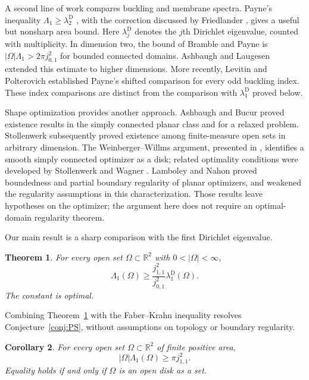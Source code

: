 \documentclass[11pt]{article}
\newtheorem{theorem}{Theorem}[section]
\newtheorem{corollary}[theorem]{Corollary}
\theoremstyle{remark}
\begin{document}
A second line of work compares buckling and membrane spectra. Payne's
inequality $\Lambda_1\ge\lambda_2^{\mathrm D}$ \cite{Payne}, with the
correction discussed by Friedlander \cite{Friedlander}, gives a useful
but nonsharp area bound. Here $\lambda_j^{\mathrm D}$ denotes the
$j$th Dirichlet eigenvalue, counted with multiplicity. In dimension two, the bound of Bramble and
Payne \cite{BramblePayne} is $|\Omega|\Lambda_1>2\pi j_{0,1}^2$ for
bounded connected domains. Ashbaugh and Laugesen \cite{AL} extended this
estimate to higher dimensions. More recently, Levitin and Polterovich
\cite{LP} established Payne's shifted comparison for every odd buckling
index. These index comparisons are distinct from the comparison with
$\lambda_1^{\mathrm D}$ proved below.

Shape optimization provides another approach. Ashbaugh and Bucur
\cite{AB} proved existence results in the simply connected planar class
and for a relaxed problem. Stollenwerk \cite{Stollenwerk} subsequently
proved existence among finite-measure open sets in arbitrary dimension.
The Weinberger--Willms argument, presented in \cite{AB}, identifies a
smooth simply connected optimizer as a disk; related optimality
conditions were developed by Stollenwerk and Wagner \cite{SW}.
Lamboley and Nahon \cite{LN} proved boundedness and partial boundary
regularity of planar optimizers, and weakened the regularity assumptions
in this characterization. Those results leave hypotheses on the
optimizer; the argument here does not require an optimal-domain
regularity theorem.

Our main result is a sharp comparison with the first Dirichlet eigenvalue.
\begin{theorem}\label{main}
For every open set $\Omega\subset\mathbb R^2$ with
$0<|\Omega|<\infty$,
\begin{equation}\label{eq:comparison}
 \Lambda_1(\Omega)\ge
       \frac{j_{1,1}^2}{j_{0,1}^2}\lambda_1^{\mathrm D}(\Omega).
\end{equation}
The constant is optimal.
\end{theorem}

Combining Theorem~\ref{main} with the Faber--Krahn inequality resolves
Conjecture~\ref{conj:PS}, without assumptions on topology or boundary
regularity.
\begin{corollary}\label{cor:area}
For every open set $\Omega\subset\mathbb R^2$ of finite positive area,
\begin{equation}\label{eq:area}
 |\Omega|\Lambda_1(\Omega)\ge\pi j_{1,1}^2.
\end{equation}
Equality holds if and only if $\Omega$ is an open disk as a set.
\end{corollary}
\end{document}
